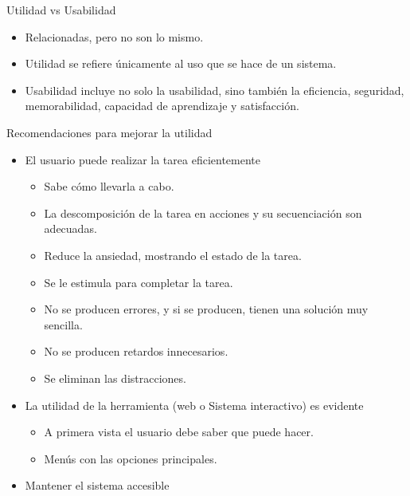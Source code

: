 \documentclass[12pt, twoside, openright]{report} %
\begin{document}
Utilidad vs Usabilidad
\begin{itemize}
  \item
  Relacionadas, pero no son lo mismo.
\item
  Utilidad se refiere únicamente al uso que se hace de un sistema.
\item
  Usabilidad incluye no solo la usabilidad, sino también la
  eficiencia, seguridad, memorabilidad, capacidad de aprendizaje y
  satisfacción.
\end{itemize}
\pagebreak

    Recomendaciones para mejorar la utilidad

    \begin{itemize}
    
    \item
      El usuario puede realizar la tarea eficientemente

      \begin{itemize}
      
      \item
        Sabe cómo llevarla a cabo.
      \item
        La descomposición de la tarea en acciones y su secuenciación son
        adecuadas.
      \item
        Reduce la ansiedad, mostrando el estado de la tarea.
      \item
        Se le estimula para completar la tarea.
      \item
        No se producen errores, y si se producen, tienen una solución
        muy sencilla.
      \item
        No se producen retardos innecesarios.
      \item
        Se eliminan las distracciones.
      \end{itemize}
    \item
      La utilidad de la herramienta (web o Sistema interactivo) es
      evidente

      \begin{itemize}
      
      \item
        A primera vista el usuario debe saber que puede hacer.
      \item
        Menús con las opciones principales.
      \end{itemize}
    \item
      Mantener el sistema accesible

      \begin{itemize}
      

\end{itemize}
\end{itemize}
\end{document}
